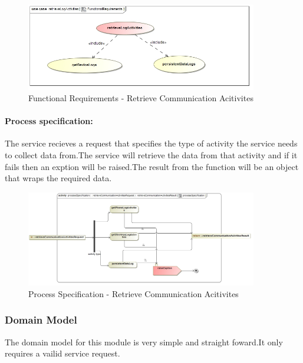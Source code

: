 \documentclass[hidelinks, 12pt, oneside]{article}
\begin{document}
		\begin{figure}[!htbp]
    		\centering
    		\includegraphics[width=0.9\textwidth]{img/functionalRequirementsRetrieveCommunicationActivities.jpg}
    		\caption{Functional Requirements - Retrieve Communication Acitivites}
    		\label{fig:FunctionalReq_retrieveCommunicationAcitivites}
		\end{figure}	
		
		
			\newpage
			\paragraph{Process specification:}
			The  service recieves a request that specifies the type of activity the service needs to collect data from.The service will retrieve the data from that activity and if it fails then an exption will be raised.The result from the function will be an object that wraps the required data.
			
			
			\begin{figure}[!htbp]
    		\centering
    		\includegraphics[width=0.9\textwidth]{img/processSpecificationRetrieveCommunicationActivities.jpg}
    		\caption{Process Specification - Retrieve Communication Acitivites}
    		\label{fig:ProcessSpec_retrieveCommunicationAcitivites}
		\end{figure}
		\newpage
	
		\subsubsection{Domain Model}
		The domain model for this module is very simple and straight foward.It only requires a vailid service request.
		
\end{document}
